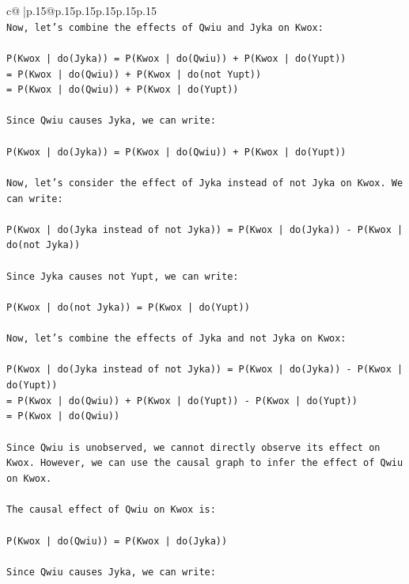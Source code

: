 \documentclass{article}
\begin{document}
{\begin{supertabular}{c@{$\;$}|p{.15\linewidth}@{}p{.15\linewidth}p{.15\linewidth}p{.15\linewidth}p{.15\linewidth}p{.15\linewidth}}
{{{\\ 
\texttt{Now, let's combine the effects of Qwiu and Jyka on Kwox:} \\
\\ 
\texttt{P(Kwox | do(Jyka)) = P(Kwox | do(Qwiu)) + P(Kwox | do(Yupt))} \\
\texttt{= P(Kwox | do(Qwiu)) + P(Kwox | do(not Yupt))} \\
\texttt{= P(Kwox | do(Qwiu)) + P(Kwox | do(Yupt))} \\
\\ 
\texttt{Since Qwiu causes Jyka, we can write:} \\
\\ 
\texttt{P(Kwox | do(Jyka)) = P(Kwox | do(Qwiu)) + P(Kwox | do(Yupt))} \\
\\ 
\texttt{Now, let's consider the effect of Jyka instead of not Jyka on Kwox. We can write:} \\
\\ 
\texttt{P(Kwox | do(Jyka instead of not Jyka)) = P(Kwox | do(Jyka)) {-} P(Kwox | do(not Jyka))} \\
\\ 
\texttt{Since Jyka causes not Yupt, we can write:} \\
\\ 
\texttt{P(Kwox | do(not Jyka)) = P(Kwox | do(Yupt))} \\
\\ 
\texttt{Now, let's combine the effects of Jyka and not Jyka on Kwox:} \\
\\ 
\texttt{P(Kwox | do(Jyka instead of not Jyka)) = P(Kwox | do(Jyka)) {-} P(Kwox | do(Yupt))} \\
\texttt{= P(Kwox | do(Qwiu)) + P(Kwox | do(Yupt)) {-} P(Kwox | do(Yupt))} \\
\texttt{= P(Kwox | do(Qwiu))} \\
\\ 
\texttt{Since Qwiu is unobserved, we cannot directly observe its effect on Kwox. However, we can use the causal graph to infer the effect of Qwiu on Kwox.} \\
\\ 
\texttt{The causal effect of Qwiu on Kwox is:} \\
\\ 
\texttt{P(Kwox | do(Qwiu)) = P(Kwox | do(Jyka))} \\
\\ 
\texttt{Since Qwiu causes Jyka, we can write:} \\
}}}
\end{supertabular}}
\end{document}
